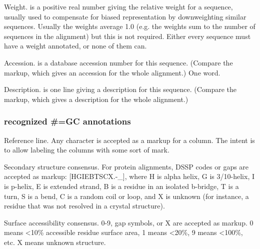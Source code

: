 \begin{wideitem}
\item [\emprog{WT  <f>}]
        Weight.  is a positive real number giving the
        relative weight for a sequence, usually used to compensate
        for biased representation by downweighting similar sequences.   
        Usually the weights average 1.0 (e.g. the weights sum to
        the number of sequences in the alignment) but this is not
        required. Either every sequence must have a weight annotated, 
        or none of them can.  

\item [\emprog{AC  <s>}]
        Accession.  is a database accession number for 
        this sequence. (Compare the  markup, which gives
        an accession for the whole alignment.) One word. 
        
\item [\emprog{DE  <s>}]
        Description.  is one line giving a description for
        this sequence. (Compare the  markup, which gives
        a description for the whole alignment.)
\end{wideitem}


\subsubsection{recognized \#=GC annotations}

\begin{wideitem}
\item [\emprog{RF}]
        Reference line. Any character is accepted as a markup for a
        column. The intent is to allow labeling the columns with some
        sort of mark.
        
\item [\emprog{SS\_cons}]
        Secondary structure consensus. For protein alignments,
        DSSP codes or gaps are accepted as markup: [HGIEBTSCX.-\_], where
        H is alpha helix, G is 3/10-helix, I is p-helix, E is extended
        strand, B is a residue in an isolated b-bridge, T is a turn, 
        S is a bend, C is a random coil or loop, and X is unknown
        (for instance, a residue that was not resolved in a crystal
        structure). 

\item [\emprog{SA\_cons}]
        Surface accessibility consensus. 0-9, gap symbols, or X are
        accepted as markup. 0 means <10\% accessible residue surface
        area, 1 means <20\%, 9 means <100\%, etc. X means unknown
        structure.
\end{wideitem}

